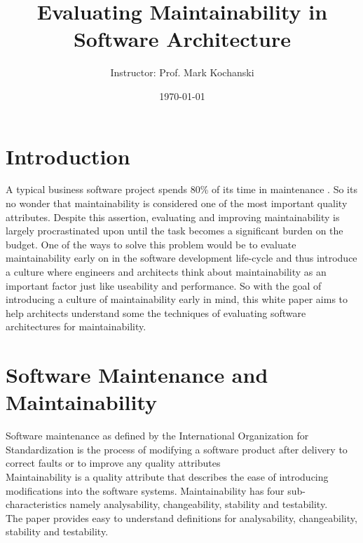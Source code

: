 \documentclass[15pt]{article}
\title{Evaluating Maintainability in Software Architecture}
\author{\Author \and
Instructor: Prof. Mark Kochanski}
\date{\today}
\begin{document}



\maketitle

\newpage

\section{Introduction}
A typical business software project spends 80\% of its time in maintenance \cite{pigoski_practical_1996}. So its no wonder that maintainability is considered one of the most important quality attributes. Despite this assertion, evaluating and improving maintainability is largely procrastinated upon until the task becomes a significant burden on the budget. One of the ways to solve this problem would be to evaluate maintainability early on in the software development life-cycle and thus introduce a culture where engineers and architects think about maintainability as an important factor just like useability and performance. So with the goal of introducing a culture of maintainability early in mind, this white paper aims to help architects understand some the techniques of evaluating software architectures for maintainability.


\section{Software Maintenance and Maintainability}
Software maintenance as defined by the International Organization for Standardization is the process of modifying a software product after delivery to correct faults or to improve any quality attributes \cite{iso_international_2006} \\

Maintainability is a quality attribute that describes the ease of introducing modifications into the software systems. Maintainability has four sub-characteristics namely analysability, changeability, stability and testability\cite{iso_international_2006}.\\

The paper \cite{heitlager_practical_2007} provides easy to understand definitions for analysability, changeability, stability and testability.
\end{document}

